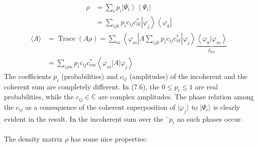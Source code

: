 \begin{equation}
\begin{aligned} \rho &=\sum_{i} p_{i}\left|\Psi_{i}\right\rangle\left\langle\Psi_{i}\right| \\ &=\sum_{i j k} p_{i} c_{i j} c_{i k}^{*}\left|\varphi_{j}\right\rangle\left\langle\varphi_{k}\right| \end{aligned}
\end{equation}
\begin{equation}
\begin{aligned}\langle A\rangle &=\operatorname{Trace}(A \rho)=\sum_{m}\left\langle\varphi_{m}\left|A \sum_{i j k} p_{i} c_{i j} c_{i k}^{*}\right| \varphi_{j}\right\rangle \underbrace{\left\langle\varphi_{k} | \varphi_{m}\right\rangle}_{\delta_{k m}} \\ &=\sum_{i j m} p_{i} c_{i j} c_{i m}^{*}\left\langle\varphi_{m}|A| \varphi_{j}\right\rangle \end{aligned}
\end{equation}
The coefficients $p_i$ (probabilities) and $c_{ij}$ (amplitudes) of the incoherent and the coherent sum are completely different. In (7.6), the $0 \leq p_i \leq 1$ are real probabilities, while the $c_{ij}\in\mathbb{C}$ are complex amplitudes. The phase relation among the $c_{ij}$ as a consequence of the coherent superposition of $|\varphi_j\rangle$ to $|\Psi_i\rangle$ is clearly evident in the result. In the incoherent sum over the ¨$p_i$ no such phases occur.\\\\
The density matrix $\rho$ has some nice properties:
